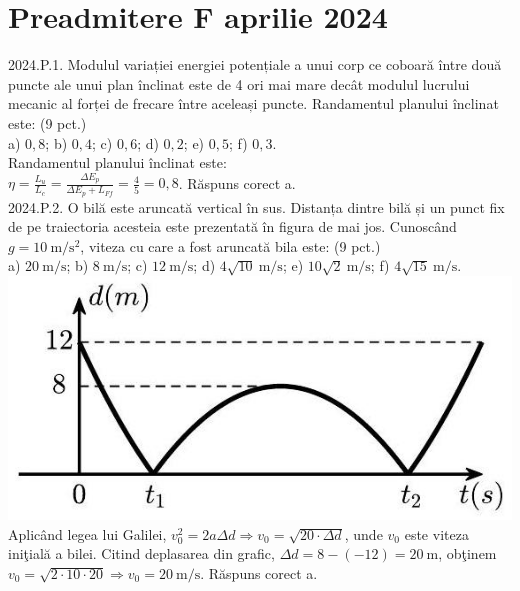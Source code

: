 \section{Preadmitere F aprilie 2024}

2024.P.1. Modulul variației energiei potențiale a unui corp ce coboară între două puncte ale unui plan înclinat este de 4 ori mai mare decât modulul lucrului mecanic al forței de frecare între aceleași puncte. Randamentul planului înclinat este: (9 pct.)\\ a) $0,8$; b) $0,4$; c) $0,6$; d) $0,2$; e) $0,5$; f) $0,3$.\\ Randamentul planului înclinat este:\\ $\eta=\frac{L_{u}}{L_{c}}=\frac{\Delta E_{p}}{\Delta E_{p}+L_{F f}}=\frac{4}{5}=0,8$. Răspuns corect a.\\

2024.P.2. O bilă este aruncată vertical în sus. Distanța dintre bilă și un punct fix de pe traiectoria acesteia este prezentată în figura de mai jos. Cunoscând $g=10 \mathrm{~m} / \mathrm{s}^{2}$, viteza cu care a fost aruncată bila este: (9 pct.)\\ a) $20 \mathrm{~m} / \mathrm{s}$; b) $8 \mathrm{~m} / \mathrm{s}$; c) $12 \mathrm{~m} / \mathrm{s}$; d) $4 \sqrt{10} \mathrm{~m} / \mathrm{s}$; e) $10 \sqrt{2} \mathrm{~m} / \mathrm{s}$; f) $4 \sqrt{15} \mathrm{~m} / \mathrm{s}$.\\ \includegraphics[width=0.4\linewidth]{images/2025_08_27_d74d983b3f0f59c27780g-1}\\ Aplicând legea lui Galilei, $v_{0}^{2}=2 a \Delta d \Rightarrow v_{0}=\sqrt{20 \cdot \Delta d}$, unde $v_{0}$ este viteza iniţială a bilei. Citind deplasarea din grafic, $\Delta d=8-(-12)=20 \mathrm{~m}$, obţinem $v_{0}=\sqrt{2 \cdot 10 \cdot 20} \Rightarrow v_{0}=20 \mathrm{~m} / \mathrm{s}$. Răspuns corect a.\\

